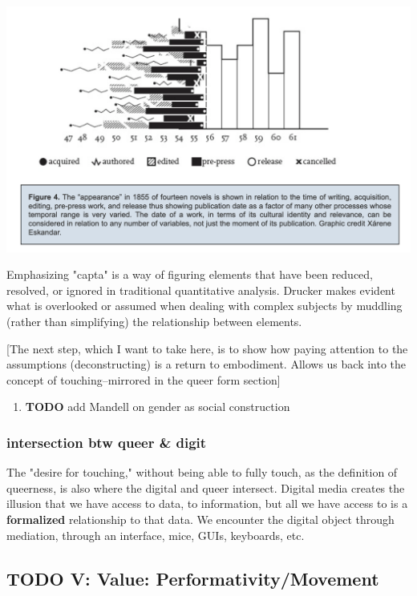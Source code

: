 \documentclass[11pt]{article}
\begin{document}
\begin{center}
\includegraphics[width=.9\linewidth]{./img/Drucker.png}
\end{center}

Emphasizing "capta" is a way of figuring elements that have been
reduced, resolved, or ignored in traditional quantitative
analysis. Drucker makes evident what is overlooked or assumed when
dealing with complex subjects by muddling (rather than simplifying)
the relationship between elements.

[The next step, which I want to take here, is to show how paying
attention to the assumptions (deconstructing) is a return to
embodiment. Allows us back into the concept of touching--mirrored in
the queer form section]

\begin{enumerate}
\item {\bfseries\sffamily TODO} add Mandell on gender as social construction
\label{sec:orge0928fc}
\end{enumerate}

\subsubsection{intersection btw queer \& digit}
\label{sec:org8b7c303}
The "desire for touching," without being able to fully touch, as the
definition of queerness, is also where the digital and queer
intersect. Digital media creates the illusion that we have access to
data, to information, but all we have access to is a \textbf{formalized}
relationship to that data. We encounter the digital object through
mediation, through an interface, mice, GUIs, keyboards, etc.




\subsection{{\bfseries\sffamily TODO} V: Value: Performativity/Movement}
\label{sec:org5d787aa}
\end{document}
